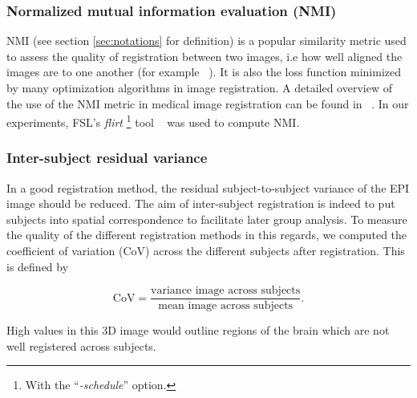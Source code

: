 
\subsubsection{Normalized mutual information evaluation (NMI)}
NMI (see section \ref{sec:notations} for definition) is a
popular similarity metric used to assess the quality of
registration between two images, i.e how well aligned the images are to one another
(for example ~\citep{maes1997multimodality}). It is also the loss function minimized by many
optimization algorithms in image registration.
A detailed overview of
the use of the NMI metric in medical image registration can be found
in ~\citep{pluim2003}.
In our experiments, FSL's \textit{flirt} \footnote{With the
   ``\textit{-schedule}'' option.}
tool ~\citep{smith2004} was used to compute NMI. 


\subsubsection{Inter-subject residual variance}
In a good registration method, the residual subject-to-subject
variance of the EPI image should be reduced. The aim of
inter-subject registration is indeed to put subjects into spatial
correspondence to facilitate later group analysis. To measure the quality of
the different registration methods in this regards, we computed the
coefficient of variation (CoV) across the different subjects after registration.
This is defined by

\begin{equation}
  \text{CoV} = \frac{\text{variance image across subjects}}{\text{mean image across subjects}}.
\end{equation}

High values in this 3D image would outline regions of the brain which are not well registered across subjects.


